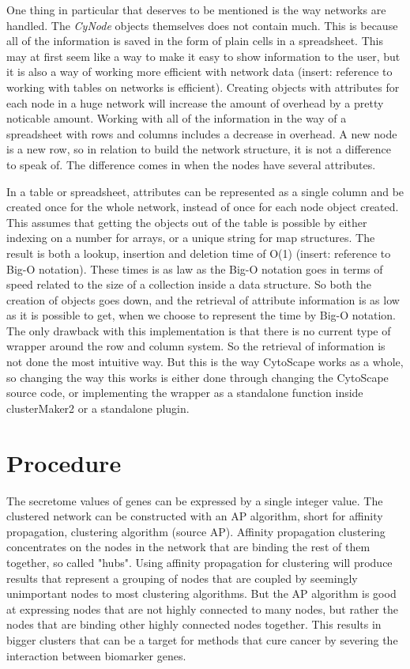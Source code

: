\documentclass[UKenglish,11pt,a4paper]{article}
\begin{document}
One thing in particular that deserves to be mentioned is the way networks are handled. The \textit{CyNode} objects
themselves does not contain much. This is because all of the information is saved in the form of plain cells in a
spreadsheet. This may at first seem like a way to make it easy to show information to the user, but it is also a way of
working more efficient with network data (insert: reference to working with tables on networks is efficient). Creating
objects with attributes for each node in a huge network will increase the amount of overhead by a pretty noticable
amount. Working with all of the information in the way of a spreadsheet with rows and columns includes a decrease in
overhead. A new node is a new row, so in relation to build the network structure, it is not a difference to speak of.
The difference comes in when the nodes have several attributes. 

In a table or spreadsheet, attributes can be represented as a single column and be created once for the whole network,
instead of once for each node object created. This assumes that getting the objects out of the table is possible by
either indexing on a number for arrays, or a unique string for map structures. The result is both a lookup, insertion
and deletion time of O(1) (insert: reference to Big-O notation).  These times is as law as the Big-O notation goes in
terms of speed related to the size of a collection inside a data structure. So both the creation of objects goes down,
and the retrieval of attribute information is as low as it is possible to get, when we choose to represent the time by
Big-O notation. The only drawback with this implementation is that there is no current type of wrapper around the row
and column system. So the retrieval of information is not done the most intuitive way. But this is the way CytoScape
works as a whole, so changing the way this works is either done through changing the CytoScape source code, or
implementing the wrapper as a standalone function inside clusterMaker2 or a standalone plugin.


\part{Procedure}
The secretome values of genes can be expressed by a single integer value. The clustered network can be constructed with
an AP algorithm, short for affinity propagation, clustering algorithm (source AP). Affinity propagation clustering
concentrates on the nodes in the network that are binding the rest of them together, so called "hubs". Using affinity
propagation for clustering will produce results that represent a grouping of nodes that are coupled by seemingly
unimportant nodes to most clustering algorithms. But the AP algorithm is good at expressing nodes that are not highly
connected to many nodes, but rather the nodes that are binding other highly connected nodes together. This results in
bigger clusters that can be a target for methods that cure cancer by severing the interaction between biomarker genes.
\end{document}

